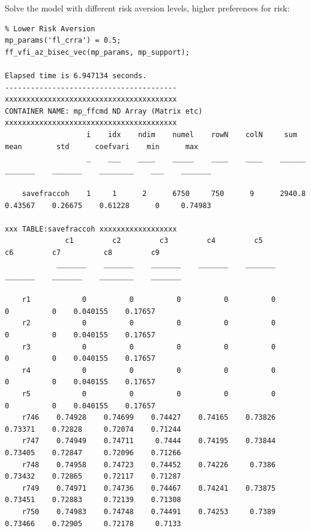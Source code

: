 \documentclass[
]{book}
\begin{document}
Solve the model with different risk aversion levels, higher preferences
for risk:

\begin{verbatim}
% Lower Risk Aversion
mp_params('fl_crra') = 0.5;
ff_vfi_az_bisec_vec(mp_params, mp_support);

Elapsed time is 6.947134 seconds.
----------------------------------------
xxxxxxxxxxxxxxxxxxxxxxxxxxxxxxxxxxxxxxxx
CONTAINER NAME: mp_ffcmd ND Array (Matrix etc)
xxxxxxxxxxxxxxxxxxxxxxxxxxxxxxxxxxxxxxxx
                   i    idx    ndim    numel    rowN    colN     sum       mean        std      coefvari    min      max  
                   _    ___    ____    _____    ____    ____    ______    _______    _______    ________    ___    _______

    savefraccoh    1     1      2      6750     750      9      2940.8    0.43567    0.26675    0.61228      0     0.74983

xxx TABLE:savefraccoh xxxxxxxxxxxxxxxxxx
              c1         c2         c3         c4         c5         c6         c7          c8         c9   
            _______    _______    _______    _______    _______    _______    _______    ________    _______

    r1            0          0          0          0          0          0          0    0.040155    0.17657
    r2            0          0          0          0          0          0          0    0.040155    0.17657
    r3            0          0          0          0          0          0          0    0.040155    0.17657
    r4            0          0          0          0          0          0          0    0.040155    0.17657
    r5            0          0          0          0          0          0          0    0.040155    0.17657
    r746    0.74928    0.74699    0.74427    0.74165    0.73826    0.73371    0.72828     0.72074    0.71244
    r747    0.74949    0.74711     0.7444    0.74195    0.73844    0.73405    0.72847     0.72096    0.71266
    r748    0.74958    0.74723    0.74452    0.74226     0.7386    0.73432    0.72865     0.72117    0.71287
    r749    0.74971    0.74736    0.74467    0.74241    0.73875    0.73451    0.72883     0.72139    0.71308
    r750    0.74983    0.74748    0.74491    0.74253     0.7389    0.73466    0.72905     0.72178     0.7133
\end{verbatim}
\end{document}
